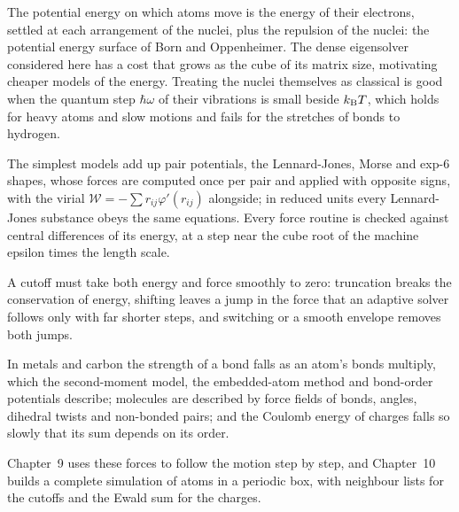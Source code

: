
The potential energy on which atoms move is the energy of their electrons,
settled at each arrangement of the nuclei, plus the repulsion of the
nuclei: the potential energy surface of Born and Oppenheimer. The dense eigensolver considered here has a cost that grows as the cube
of its matrix size, motivating cheaper models of the energy. Treating the nuclei
themselves as classical is good when the quantum step $\hbar\omega$ of
their vibrations is small beside $k_{\mathrm{B}} T$, which holds for heavy atoms and
slow motions and fails for the stretches of bonds to hydrogen.

The simplest models add up pair potentials, the Lennard-Jones, Morse and
exp-6 shapes, whose forces are computed once per pair and applied with
opposite signs, with the virial $\mathcal{W} = -\sum r_{ij}\varphi'(r_{ij})$
alongside; in reduced units every Lennard-Jones substance obeys the same
equations. Every force routine is checked against central differences of
its energy, at a step near the cube root of the machine epsilon times the
length scale.

A cutoff must take both energy and force smoothly to zero:
truncation breaks the conservation of energy, shifting leaves a jump in
the force that an adaptive solver follows only with far shorter steps,
and switching or a smooth envelope removes both jumps.

In metals and carbon the strength of a bond
falls as an atom's bonds multiply, which the second-moment model, the
embedded-atom method and bond-order potentials describe; molecules are
described by force fields of bonds, angles, dihedral twists and
non-bonded pairs; and the Coulomb energy of charges falls so slowly that
its sum depends on its order.

Chapter~9 uses these forces to follow the motion step by step, and
Chapter~10 builds a complete simulation of atoms in a periodic box, with
neighbour lists for the cutoffs and the Ewald sum for the charges.
